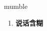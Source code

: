 
\begin{frame}
{\huge mumble}
\begin{center}
\begin{enumerate}\Large
  \item \textbf{说话含糊}
\end{enumerate}
\end{center}
\end{frame}
